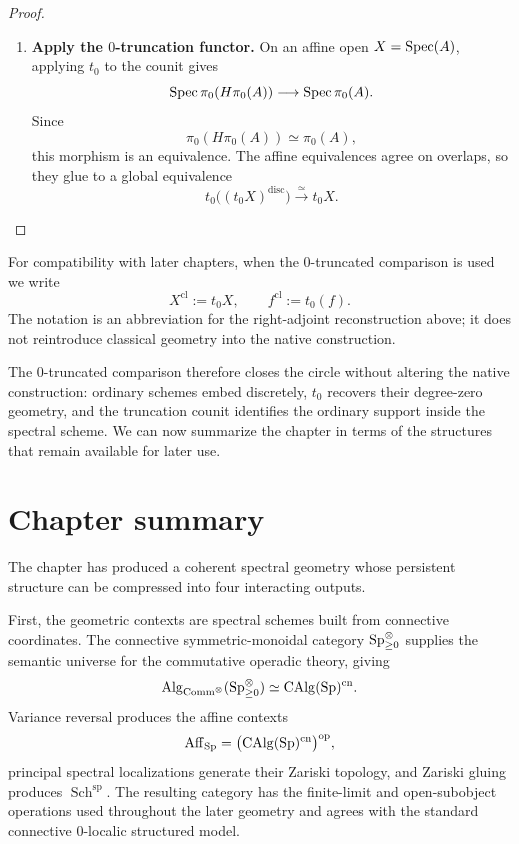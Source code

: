 \begin{proof}
\begin{enumerate}[label=\textup{(\arabic*)}]
    \item \textbf{Apply the \(0\)-truncation functor.}
    On an affine open \(X=\operatorname{Spec}(A)\), applying \(t_0\) to the counit gives
    \[
        \operatorname{Spec}\pi_0(H\pi_0(A))
        \longrightarrow
        \operatorname{Spec}\pi_0(A).
    \]
    Since
    \[
        \pi_0(H\pi_0(A))
        \simeq
        \pi_0(A),
    \]
    this morphism is an equivalence. The affine equivalences agree on
    overlaps, so they glue to a global equivalence
    \[
        t_0\bigl((t_0X)^{\mathrm{disc}}\bigr)
        \xrightarrow{\simeq}
        t_0X.
    \]
\end{enumerate}
\end{proof}

\begin{convention}
\label{conv:classical-comparison-notation}
For compatibility with later chapters, when the \(0\)-truncated comparison is
used we write
\[
    X^{\mathrm{cl}}:=t_0X,
    \qquad
    f^{\mathrm{cl}}:=t_0(f).
\]
The notation is an abbreviation for the right-adjoint reconstruction above;
it does not reintroduce classical geometry into the native construction.
\end{convention}

The \(0\)-truncated comparison therefore closes the circle without altering
the native construction: ordinary schemes embed discretely, \(t_0\) recovers
their degree-zero geometry, and the truncation counit identifies the ordinary
support inside the spectral scheme. We can now summarize the chapter in terms
of the structures that remain available for later use.

\section{Chapter summary}
\label{sec:spectral-geometric-output}

The chapter has produced a coherent spectral geometry whose persistent
structure can be compressed into four interacting outputs.

First, the geometric contexts are spectral schemes built from connective
coordinates. The connective symmetric-monoidal category
\(\operatorname{Sp}_{\geq0}^\otimes\) supplies the semantic universe for the commutative
operadic theory, giving
\[
    \operatorname{Alg}_{\mathrm{Comm}^\otimes}(\operatorname{Sp}_{\geq0}^\otimes)
    \simeq
    \operatorname{CAlg}(\operatorname{Sp})^{\mathrm{cn}}.
\]
Variance reversal produces the affine contexts
\[
    \operatorname{Aff}_{\operatorname{Sp}}
    =
    \bigl(\operatorname{CAlg}(\operatorname{Sp})^{\mathrm{cn}}\bigr)^{\mathrm{op}},
\]
principal spectral localizations generate their Zariski topology, and Zariski
gluing produces \(\operatorname{Sch}^{\mathrm{sp}}\). The resulting category
has the finite-limit and open-subobject operations used throughout the later
geometry and agrees with the standard connective \(0\)-localic structured
model.

